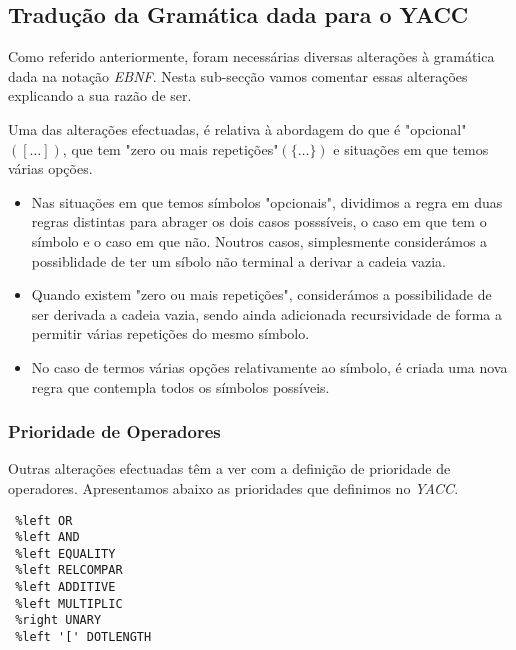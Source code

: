 \documentclass[11pt,a4paper]{article}
\begin{document}
\subsection{Tradução da Gramática dada para o YACC}

Como referido anteriormente, foram necessárias diversas alterações à gramática dada na notação \textit{EBNF}. Nesta sub-secção vamos comentar essas alterações explicando a sua razão de ser.

Uma das alterações efectuadas, é relativa à abordagem do que é "opcional"$([\dots])$, que tem "zero ou mais repetições"$(\{\dots\})$ e situações em que temos várias opções.

\begin{itemize}
	\item Nas situações em que temos símbolos "opcionais", dividimos a regra em duas regras distintas para abrager os dois casos posssíveis, o caso em que tem o símbolo e o caso em que não. Noutros casos, simplesmente considerámos a possiblidade de ter um síbolo não terminal a derivar a cadeia vazia.
	
	\item Quando existem "zero ou mais repetições", considerámos a possibilidade de ser derivada a cadeia vazia, sendo ainda adicionada recursividade de forma a permitir várias repetições do mesmo símbolo.
	
	\item No caso de termos várias opções relativamente ao símbolo, é criada uma nova regra que contempla todos os símbolos possíveis.  
\end{itemize} 

\subsubsection{Prioridade de Operadores}

Outras alterações efectuadas têm a ver com a definição de prioridade de operadores. Apresentamos abaixo as prioridades que definimos no \textit{YACC}.

\newpage 
 
\begin{lstlisting}
 %left OR
 %left AND
 %left EQUALITY
 %left RELCOMPAR
 %left ADDITIVE
 %left MULTIPLIC
 %right UNARY
 %left '[' DOTLENGTH
\end{lstlisting}

\vspace{0.5cm}
\end{document}
